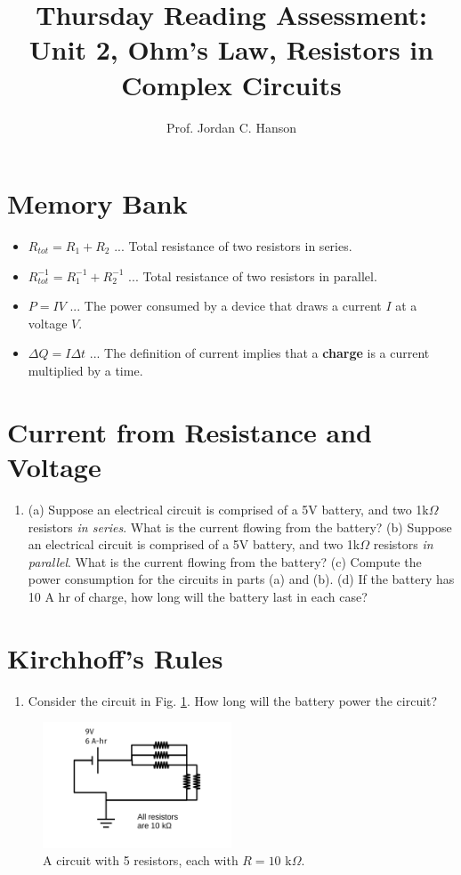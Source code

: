 \documentclass{article}
\begin{document}
\title{Thursday Reading Assessment: Unit 2, Ohm's Law, Resistors in Complex Circuits}
\author{Prof. Jordan C. Hanson}

\maketitle

\section{Memory Bank}

\begin{itemize}
\item $R_{tot} = R_1 + R_2$ ... Total resistance of two resistors in series.
\item $R_{tot}^{-1} = R_1^{-1} + R_2^{-1}$ ... Total resistance of two resistors in parallel.
\item $P = IV$ ... The power consumed by a device that draws a current $I$ at a voltage $V$.
\item $\Delta Q = I \Delta t$ ... The definition of current implies that a \textbf{charge} is a current multiplied by a time.
\end{itemize}

\section{Current from Resistance and Voltage}

\begin{enumerate}
\item (a) Suppose an electrical circuit is comprised of a 5V battery, and two 1k$\Omega$ resistors \textit{in series}.  What is the current flowing from the battery? (b) Suppose an electrical circuit is comprised of a 5V battery, and two 1k$\Omega$ resistors \textit{in parallel}.  What is the current flowing from the battery? (c) Compute the power consumption for the circuits in parts (a) and (b).  (d) If the battery has 10 A hr of charge, how long will the battery last in each case? \\ \vspace{2cm}
\end{enumerate}

\section{Kirchhoff's Rules}

\begin{enumerate}
\item Consider the circuit in Fig. \ref{fig:circ}. How long will the battery power the circuit?
\end{enumerate}

\begin{figure}[hb]
\centering
\includegraphics[width=0.5\textwidth,trim=0cm 1.0cm 0cm 1cm,clip=true]{figures/circuitExample1.pdf}
\caption{\label{fig:circ} A circuit with 5 resistors, each with $R=10$ k$\Omega$.}
\end{figure}
\end{document}
